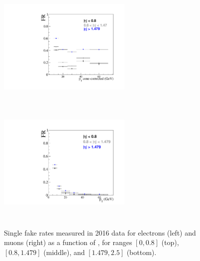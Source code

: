 \begin{figure}[h]
  \centering
  \includegraphics[height=6cm, width=6.4cm]{Figures/c6/backgrounds/FR/sFR/data/electrons.pdf}
  \includegraphics[height=6cm, width=6.4cm]{Figures/c6/backgrounds/FR/sFR/data/muons.pdf}\\
  \caption{Single fake rates measured in 2016 data for electrons (left) and
    muons (right) as a function of \ptc, for \abseta ranges $[0,0.8]$
    (top), $[0.8,1.479]$ (middle), and $[1.479,2.5]$ (bottom).}
  \label{fig:sfr_data}
\end{figure}

